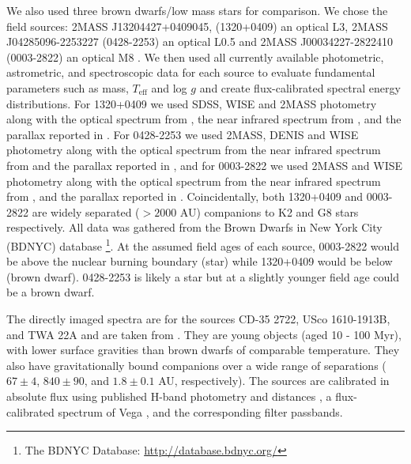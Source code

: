 \documentclass[twocolumn, trackchanges]{aastex61}
\begin{document}
We also used three brown dwarfs/low mass stars for comparison. We chose the field sources: 2MASS J13204427+0409045, (1320+0409) an optical L3, 2MASS J04285096-2253227 (0428-2253) an optical L0.5 and 2MASS J00034227-2822410 (0003-2822) an optical M8 \citep[see][]{filippazzo15}.  We then used all currently available photometric, astrometric, and spectroscopic data for each source to evaluate fundamental parameters such as mass, $T_\mathrm{eff}$ and log $g$ \citep{filippazzo15, faherty16} and create flux-calibrated spectral energy distributions.  For 1320+0409 we used SDSS, WISE and 2MASS photometry along with the optical spectrum from \cite{reid08}, the near infrared spectrum from \cite{bardalez14}, and the parallax reported in \cite{2012ApJ...752...56F}. For 0428-2253 we used 2MASS, DENIS and WISE photometry along with the optical spectrum from \cite{2003A&A...403..929K} the near infrared spectrum from \cite{bardalez14} and the parallax reported in \cite{2014AJ....147...94D}, and for 0003-2822 we used 2MASS and WISE photometry along with the optical spectrum from \cite{2007AJ....133..439C} the near infrared spectrum from \cite{2018AJ....155...34C}, and the parallax reported in \cite{2010AJ....139..176F}.  Coincidentally, both 1320+0409 and 0003-2822 are widely separated ($> 2000$ AU) companions to K2 and G8 stars respectively.  All data was gathered from the Brown Dwarfs in New York City (BDNYC) database \citep{filippazzo15}\footnote{The BDNYC Database: \url{http://database.bdnyc.org/}}.  At the assumed field ages of each source, 0003-2822 would be above the nuclear burning boundary (star) while 1320+0409 would be below (brown dwarf).  0428-2253 is likely a star but at a slightly younger field age could be a brown dwarf.

The directly imaged spectra are for the sources CD-35 2722, USco 1610-1913B, and TWA 22A and are taken from \cite{wahhaj11, aller13, bonnefoy14}. They are young objects (aged 10 - 100 Myr), with lower surface gravities than brown dwarfs of comparable temperature. They also have gravitationally bound companions over a wide range of separations ($67\pm4$, $840\pm90$, and $1.8\pm0.1$ AU, respectively). The sources are calibrated in absolute flux using published H-band photometry \citep{wahhaj11, aller13, bonnefoy09} and distances \citep{gaia16, teixeira09}, a flux-calibrated spectrum of Vega \citep{1985A&A...151..399M, 1985IAUS..111..225H}, and the corresponding filter passbands.  
\end{document}
